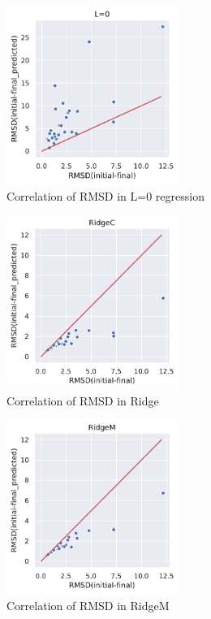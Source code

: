 \documentclass[12pt,twoside]{article}
\begin{document}
\begin{figure}[h]
\centering
\includegraphics[width=0.5\textwidth]{L_0.pdf}
\caption{Correlation of RMSD in L=0 regression}
\label{fig:hist2}
\end{figure} 
\begin{figure}[h]
\centering
\includegraphics[width=0.5\textwidth]{RidgeC.pdf}
\caption{Correlation of RMSD in Ridge}
\label{fig:hist2}
\end{figure} 
\begin{figure}[h]
\centering
\includegraphics[width=0.5\textwidth]{RidgeM.pdf}
\caption{Correlation of RMSD in RidgeM}
\label{fig:hist2}
\end{figure} 
\end{document}
